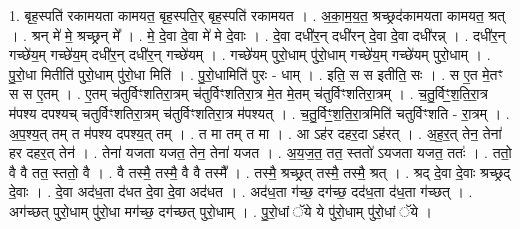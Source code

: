 \documentclass[17pt]{extarticle}
\begin{document}
1. बृह॒स्पति॑ रकामयता कामयत॒ बृह॒स्पति॒र् बृह॒स्पति॑ रकामयत । . अ॒का॒म॒य॒त॒ श्रच्छ्रद॑कामयता कामयत॒ श्रत् । . श्रन् मे॑ मे॒ श्रच्छ्रन् मे᳚ । . मे॒ दे॒वा दे॒वा मे॑ मे दे॒वाः । . दे॒वा दधी॑र॒न् दधी॑रन् दे॒वा दे॒वा दधी॑रन्न् । . दधी॑र॒न् गच्छे॑य॒म् गच्छे॑य॒म् दधी॑र॒न् दधी॑र॒न् गच्छे॑यम् । . गच्छे॑यम् पुरो॒धाम् पु॑रो॒धाम् गच्छे॑य॒म् गच्छे॑यम् पुरो॒धाम् । . पु॒रो॒धा मितीति॑ पुरो॒धाम् पु॑रो॒धा मिति॑ । . पु॒रो॒धामिति॑ पुरः - धाम् । . इति॒ स स इतीति॒ सः । . स ए॒त मे॒तꣳ स स ए॒तम् । . ए॒तम् च॑तुर्विꣳशतिरा॒त्रम् च॑तुर्विꣳशतिरा॒त्र मे॒त मे॒तम् च॑तुर्विꣳशतिरा॒त्रम् । . च॒तु॒र्विꣳ॒॒श॒ति॒रा॒त्र म॑पश्य दपश्यच् चतुर्विꣳशतिरा॒त्रम् च॑तुर्विꣳशतिरा॒त्र म॑पश्यत् । . च॒तु॒र्विꣳ॒॒श॒ति॒रा॒त्रमिति॑ चतुर्विꣳशति - रा॒त्रम् । . अ॒प॒श्य॒त् तम् त म॑पश्य दपश्य॒त् तम् । . त मा तम् त मा । . आ ऽह॑र दहर॒दा ऽह॑रत् । . अ॒ह॒र॒त् तेन॒ तेना॑ हर दहर॒त् तेन॑ । . तेना॑ यजता यजत॒ तेन॒ तेना॑ यजत । . अ॒य॒ज॒त॒ तत॒ स्ततो॑ ऽयजता यजत॒ ततः॑ । . ततो॒ वै वै तत॒ स्ततो॒ वै । . वै तस्मै॒ तस्मै॒ वै वै तस्मै᳚ । . तस्मै॒ श्रच्छ्रत् तस्मै॒ तस्मै॒ श्रत् । . श्रद् दे॒वा दे॒वाः श्रच्छ्रद् दे॒वाः । . दे॒वा अद॑ध॒ता द॑धत दे॒वा दे॒वा अद॑धत । . अद॑ध॒ता ग॑च्छ॒ दग॑च्छ॒ दद॑ध॒ता द॑ध॒ता ग॑च्छत् । . अग॑च्छत् पुरो॒धाम् पु॑रो॒धा मग॑च्छ॒ दग॑च्छत् पुरो॒धाम् । . पु॒रो॒धां ॅये ये पु॑रो॒धाम् पु॑रो॒धां ॅये । \newline
\end{document}
